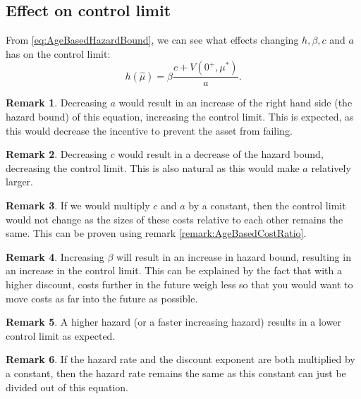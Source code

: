 \documentclass[a4paper]{thesis}
\theoremstyle{definition}
\newtheorem{remark}{Remark}[chapter]
\begin{document}
\subsection{Effect on control limit}
From \eqref{eq:AgeBasedHazardBound}, we can see what effects changing $h,\beta,c$ and $a$ has on the control limit:
\[h(\hat{\mu})=\beta\frac{c+V(0^+,\mu^*)}{a}.\]
\begin{remark}
	Decreasing  $a$ would result in an increase of the right hand side (the hazard bound) of this equation, increasing the control limit.
	This is expected, as this would decrease the incentive to prevent the asset from failing.
\end{remark}
\begin{remark}
	Decreasing $c$ would result in a decrease of the hazard bound, decreasing the control limit.
	This is also natural as this would make $a$ relatively larger.
\end{remark}
\begin{remark}
	If we would multiply $c$ and $a$ by a constant, then the control limit would not change as the sizes of these costs relative to each other remains the same.
	This can be proven using remark \ref{remark:AgeBasedCostRatio}.
\end{remark}
\begin{remark}\label{remark:AgeBasedControlLimitDiscountIncrease}
	Increasing $\beta$ will result in an increase in hazard bound, resulting in an increase in the control limit.
	This can be explained by the fact that with a higher discount, costs further in the future weigh less so that you would want to move costs as far into the future as possible.
\end{remark}
\begin{remark}
	A higher hazard (or a faster increasing hazard) results in a lower control limit as expected.
\end{remark}
\begin{remark}\label{remark:AgeBasedControlLimitDiscountAndHazardIncrease}
	If the hazard rate and the discount exponent are both multiplied by a constant, then the hazard rate remains the same as this constant can just be divided out of this equation.
\end{remark}
\end{document}
